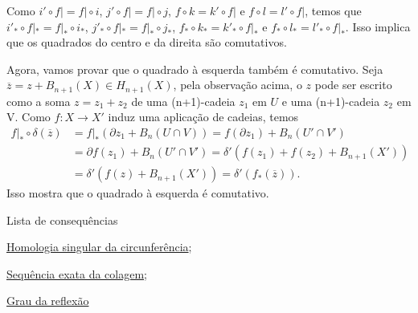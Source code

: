 \begin{dem}
    Como $i'\circ f|=f|\circ i$, $j'\circ f|=f|\circ j$, $f\circ k=k'\circ f|$ e $f\circ l=l'\circ f|$, temos que $i'_*\circ f|_*=f|_*\circ i_*$, $j'_*\circ f|_*=f|_*\circ j_*$, $f_*\circ k_*=k'_*\circ f|_*$ e $f_*\circ l_*=l'_*\circ f|_*$. Isso implica que os quadrados do centro e da direita são comutativos.

    Agora, vamos provar que o quadrado à esquerda também é comutativo. Seja $\overline{z}=z+B_{n+1}(X)\in H_{n+1}(X)$, pela observação acima, o $z$ pode ser escrito como a soma $z=z_1+z_2$ de uma (n+1)-cadeia $z_1$ em $U$ e uma (n+1)-cadeia $z_2$ em V. Como $f:X\rightarrow X'$ induz uma aplicação de cadeias, temos 
    \begin{align*}
        f|_*\circ \delta(\overline{z}) & =f|_*(\partial z_1+B_{n}(U\cap V))=f(\partial z_1)+B_n(U'\cap V')\\
        &=\partial f(z_1)+B_n(U'\cap V')=\delta'(f(z_1)+f(z_2)+B_{n+1}(X'))\\
        &=\delta'(f(z)+B_{n+1}(X'))=\delta'(f_*(\overline{z})).
    \end{align*}
    Isso mostra que o quadrado à esquerda é comutativo.
\end{dem}
\begin{titlemize}{Lista de consequências}
    \item \hyperref[homologia-singular-de-S1-prop]{Homologia singular da circunferência};\\
    \item \hyperref[sequencia-exata-da-colagem-prop]{Sequência exata da colagem};\\
    \item \hyperref[grau-da-reflexao-prop]{Grau da reflexão}
\end{titlemize}
